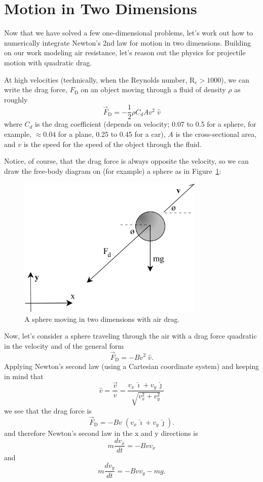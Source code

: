 \pagebreak
%
\section{Motion in Two Dimensions}
\label{sec-2d}
%
Now that we have solved a few one-dimensional problems, let's work out how to numerically integrate Newton's 2nd law for  motion in two dimensions. Building on our work modeling air resistance, let's reason out the physics for projectile motion with quadratic drag. 

At high velocities (technically, when the Reynolds number, R$_e  > 1000$), we can write the drag force, $F_\mathrm{D}$ on an object moving through a fluid of density $\rho$ as roughly
\begin{equation} 
\vec{F}_{\mathrm{D}} = - \frac{1}{2}\rho C_d A v^2\;\hat{v} 
\label{eq:drag}
\end{equation}
where 
$C_d$ is the drag coefficient (depends on velocity; 0.07 to 0.5 for a sphere, for example, $\approx 0.04$ for a plane, 0.25 to 0.45 for a car), $A$ is the cross-sectional area, and $v$ is the speed for the speed of the object through the fluid.

Notice, of course, that the drag force is always opposite the velocity, so we can draw the free-body diagram on (for example) a sphere as in Figure~\ref{fig:2DFreeBody}:
\begin{figure}
	\includegraphics[width=3.5in]{Figures/5Kinematics/2DFreeBody.png}
	\caption{A sphere moving in two dimensions with air drag.}\label{fig:2DFreeBody}
\end{figure}

Now, let's consider a sphere traveling through the air with a drag force quadratic in the velocity and of the general form 
$$  \vec{F}_{\mathrm{D}} = - B v^2\;\hat{v}.   $$
Applying Newton's second law (using a Cartesian coordinate system) and keeping in mind that 
$$\hat{v} = \frac{\vec{v}}{v} = \frac{v_x \,\hat{\imath} + v_y \,\hat{\jmath}}{\sqrt{v_x^2 + v_y^2}}$$
we see that the drag force is 
$$  \vec{F}_{\mathrm{D}} = - B v\;\left(v_x \,\hat{\imath} + v_y \,\hat{\jmath}\right).    $$
and therefore Newton's second law in the x and y directions is 
$$ m \frac{dv_x}{dt} = -B v v_x $$
and 
$$  m \frac{dv_y}{dt} = -B v v_y -mg. $$

